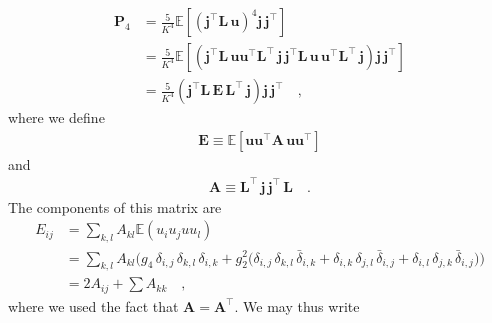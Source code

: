 \begin{align}
    \mathbf{P}_4 & = \frac{5}{K^4}\mathbb{E}\left[ \left(\mathbf{j}^\top \mathbf{L} \, \mathbf{u}\right)^4 \mathbf{j} \, \mathbf{j}^\top \right]
    \nonumber                                                                                                                                                                                                                                                                                 \\
                 & = \frac{5}{K^4}\mathbb{E}\left[\left(\mathbf{j}^\top \mathbf{L} \,  \mathbf{u} \mathbf{u}^\top  \mathbf{L}^\top \, \mathbf{j} \, \mathbf{j}^\top \mathbf{L} \,  \mathbf{u} \, \mathbf{u}^\top  \mathbf{L}^\top \, \mathbf{j} \right) \mathbf{j} \, \mathbf{j}^\top \right]
    \nonumber                                                                                                                                                                                                                                                                                 \\
                 & = \frac{5}{K^4}\left(\mathbf{j}^\top \mathbf{L} \, \mathbf{E} \, \mathbf{L}^\top \, \mathbf{j} \right) \mathbf{j} \, \mathbf{j}^\top
    \quad,
\end{align}
%
where we define
%
\begin{align}
    \mathbf{E} \equiv \mathbb{E}\left[ \mathbf{u} \mathbf{u}^\top  \mathbf{A} \,  \mathbf{u} \mathbf{u}^\top \right]
\end{align}
%
and
%
\begin{align}
    \mathbf{A} \equiv \mathbf{L}^\top \, \mathbf{j} \, \mathbf{j}^\top \, \mathbf{L}
    \quad.
\end{align}
%
The components of this matrix are
%
\begin{align}
    E_{ij} & =
    \sum\limits_{k,l}A_{kl} \mathbb{E}(u_i u_j u u_l)
    \nonumber  \\
           & =
    \sum\limits_{k,l}A_{kl}
    \Big(
    g_4 \, \delta_{i, j} \, \delta_{k, l} \, \delta_{i, k}
    +
    g_2^2 \big(
        \delta_{i, j} \, \delta_{k, l} \, \bar{\delta}_{i, k}
        +
        \delta_{i, k} \, \delta_{j, l} \, \bar{\delta}_{i, j}
        +
        \delta_{i, l} \, \delta_{j, k} \, \bar{\delta}_{i, j}
        \big)
    \Big)
    \nonumber  \\
           & =
    2 A_{ij} + \sum\limits A_{kk}
    \quad,
\end{align}
%
where we used the fact that $\mathbf{A} = \mathbf{A}^\top$. We may thus write
